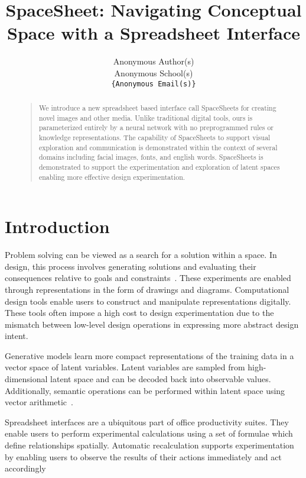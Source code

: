 \documentclass[letterpaper]{article}
\title{SpaceSheet: Navigating Conceptual Space with a Spreadsheet Interface}
\author{
  Anonymous Author(s)\\
  Anonymous School(s)\\
  \texttt{\{Anonymous Email(s)\}} \\
}
\begin{document}
 
\maketitle
\begin{abstract}
\begin{quote}
We introduce a new spreadsheet based interface call SpaceSheets for creating novel images and other media. Unlike traditional digital tools, ours is parameterized entirely by a neural network with no preprogrammed rules or knowledge representations. The capability of SpaceSheets to support visual exploration and communication is demonstrated within the context of several domains including facial images, fonts, and english words. SpaceSheets is demonstrated to support the experimentation and exploration of latent spaces enabling more effective design experimentation.
\end{quote}
\end{abstract}

\section{Introduction}

Problem solving can be viewed as a search for a solution within a space. In design, this process involves generating solutions and evaluating their consequences relative to goals and constraints~\cite{simon95}. These experiments are enabled through representations in the form of drawings and diagrams. Computational design tools enable users to construct and manipulate representations digitally. These tools often impose a high cost to design experimentation due to the mismatch between low-level design operations in expressing more abstract design intent.

Generative models learn more compact representations of the training data in a vector space of latent variables. Latent variables are sampled from high-dimensional latent space and can be decoded back into observable values. Additionally, semantic operations can be performed within latent space using vector arithmetic~\cite{white16}.

Spreadsheet interfaces are a ubiquitous part of office productivity suites. They enable users to perform experimental calculations using a set of formulae which define relationships spatially. Automatic recalculation supports experimentation by enabling users to observe the results of their actions immediately and act accordingly




\end{document}
